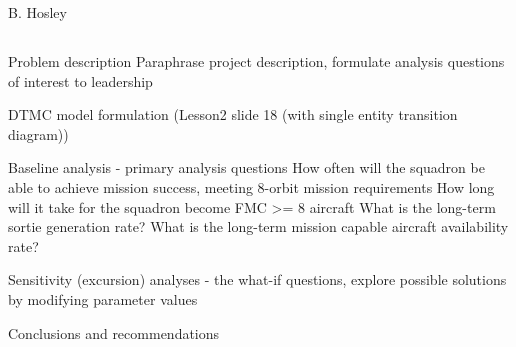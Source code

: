 \documentclass[12pt]{amsart}
\begin{document}
\raggedbottom

%
\hspace{\fill} {\large B. Hosley}
\bigskip


\setcounter{section}{1}
\setcounter{subsection}{0}
\subsection{}


Problem description
	Paraphrase project description,
	formulate analysis questions of interest to leadership
	
DTMC model formulation (Lesson2 slide 18 (with single entity transition diagram))

Baseline analysis - primary analysis questions
	How often will the squadron be able to achieve mission success, meeting 8-orbit mission requirements
	How long will it take for the squadron become FMC >= 8 aircraft
	What is the long-term sortie generation rate?
	What is the long-term mission capable aircraft availability rate?

Sensitivity (excursion) analyses - the what-if questions, 
	explore possible solutions by modifying parameter values
	
Conclusions and recommendations
\end{document}
